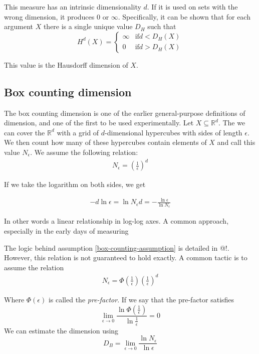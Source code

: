 \documentclass[11pt]{article}
\begin{document}
This measure has an intrinsic dimensionality $d$. If it is used on sets with the wrong dimension, it produces $0$ or $\infty$. Specifically, it can be shown that for each argument $X$ there is a single unique value $D_H$ such that 
\[
H^d(X) = \left \{ 
\begin{array}{rl}
  \infty &\mbox{if} d < D_H(X) \\
  0 &\mbox{if} d > D_H(X)
\end{array} \right.
\]

This value is the Hausdorff dimension of $X$.

\subsection{Box counting dimension}

The box counting dimension is one of the earlier general-purpose definitions of dimension, and one of the first to be used experimentally. Let $X \subseteq {\mathbb R}^d$. The we can cover the ${\mathbb R}^d$ with a grid of $d$-dimensional hypercubes with sides of length $\epsilon$. We then count how many of these hypercubes contain elements of $X$ and call this value $N_\epsilon$. We assume the following relation:
\begin{align}
\label{box-counting-assumption}
N_\epsilon = \left (\frac{1}{\epsilon}\right) ^ d
\end{align}

If we take the logarithm on both sides, we get

\begin{align*}
 - d \ln \epsilon = \ln N_\epsilon
 d = - \frac{\ln \epsilon}{\ln N_\epsilon}
\end{align*}

In other words a linear relationship in log-log axes. A common approach, especially in the early days of measuring 

The logic behind assumption \ref{box-counting-assumption} is detailed in @!. However, this relation is not guaranteed to hold exactly. A common tactic is to assume the relation 
\begin{align}
N_\epsilon = \Phi\left(\frac{1}{\epsilon}\right)\left (\frac{1}{\epsilon}\right) ^ d
\end{align}

Where $\Phi\left(\epsilon\right)$ is called the \textit{pre-factor}. If we say that the pre-factor satisfies
\[
\lim_{\epsilon \rightarrow 0} \frac{\ln \Phi(\frac{1}{\epsilon})}{\ln \frac{1}{\epsilon}} = 0
\]
We can estimate the dimension using 
\[
D_B = \lim_{\epsilon \rightarrow 0} \frac{\ln N_\epsilon}{ \ln \epsilon}
\]
\end{document}
